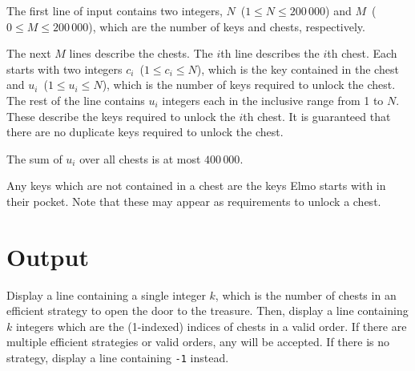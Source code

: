 The first line of input contains two integers, $N$~($1 \leq N \leq 200\,000$) and $M$~($0 \leq M \leq 200\,000$), which are the number of keys and chests, respectively.

The next $M$ lines describe the chests. The $i$th line describes the $i$th chest. Each starts with two integers $c_i$~($1 \leq c_i \leq N$), which is the key contained in the chest and $u_i$~($1 \leq u_i \leq N$), which is the number of keys required to unlock the chest. The rest of the line contains $u_i$ integers each in the inclusive range from 1 to $N$. These describe the keys required to unlock the $i$th chest. It is guaranteed that there are no duplicate keys required to unlock the chest.

The sum of $u_i$ over all chests is at most $400\,000$.

Any keys which are not contained in a chest are the keys Elmo starts with in their pocket. Note that these may appear as requirements to unlock a chest.


\section*{Output}

Display a line containing a single integer $k$, which is the number of chests in an efficient strategy to open the door to the treasure. Then, display a line containing $k$ integers which are the (1-indexed) indices of chests in a valid order. If there are multiple efficient strategies or valid orders, any will be accepted. If there is no strategy, display a line containing \texttt{-1} instead.
